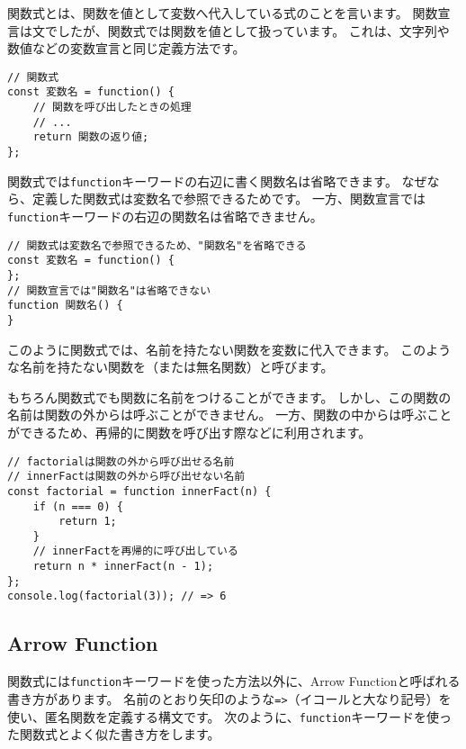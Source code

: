 関数式とは、関数を値として変数へ代入している式のことを言います。
関数宣言は文でしたが、関数式では関数を値として扱っています。
これは、文字列や数値などの変数宣言と同じ定義方法です。

\begin{lstlisting}
// 関数式
const 変数名 = function() {
    // 関数を呼び出したときの処理
    // ...
    return 関数の返り値;
};
\end{lstlisting}

関数式では\texttt{function}キーワードの右辺に書く関数名は省略できます。
なぜなら、定義した関数式は変数名で参照できるためです。
一方、関数宣言では\texttt{function}キーワードの右辺の関数名は省略できません。

\enlargethispage{\baselineskip}\begin{lstlisting}
// 関数式は変数名で参照できるため、"関数名"を省略できる
const 変数名 = function() {
};
// 関数宣言では"関数名"は省略できない
function 関数名() {
}
\end{lstlisting}

このように関数式では、名前を持たない関数を変数に代入できます。
このような名前を持たない関数を\textbf{}（または無名関数）と呼びます。

もちろん関数式でも関数に名前をつけることができます。
しかし、この関数の名前は関数の外からは呼ぶことができません。
一方、関数の中からは呼ぶことができるため、再帰的に関数を呼び出す際などに利用されます。

\begin{lstlisting}
// factorialは関数の外から呼び出せる名前
// innerFactは関数の外から呼び出せない名前
const factorial = function innerFact(n) {
    if (n === 0) {
        return 1;
    }
    // innerFactを再帰的に呼び出している
    return n * innerFact(n - 1);
};
console.log(factorial(3)); // => 6
\end{lstlisting}

\hypertarget{arrow-function}{%
\subsection[Arrow Function]{Arrow Function\,\protect{}}\label{arrow-function}}

関数式には\texttt{function}キーワードを使った方法以外に、Arrow
Functionと呼ばれる書き方があります。
名前のとおり矢印のような\texttt{=>}（イコールと大なり記号）を使い、匿名関数を定義する構文です。
次のように、\texttt{function}キーワードを使った関数式とよく似た書き方をします。

